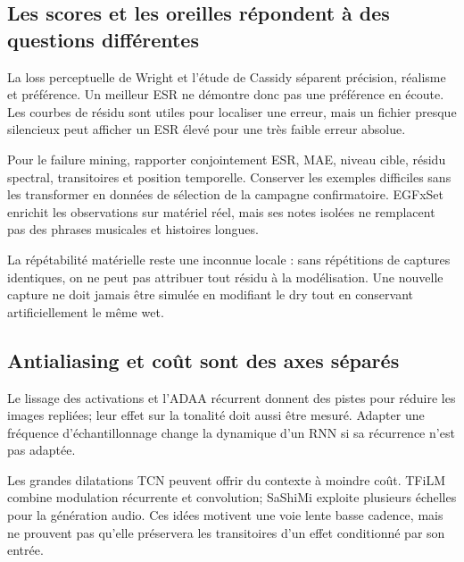 \documentclass[10pt,a4paper]{article}
\begin{document}
\subsection{Les scores et les oreilles r\'{e}pondent \`{a} des questions diff\'{e}rentes}

La loss perceptuelle de Wright et l'\'{e}tude de Cassidy s\'{e}parent pr\'{e}cision, r\'{e}alisme et pr\'{e}f\'{e}rence.
Un meilleur ESR ne d\'{e}montre donc pas une pr\'{e}f\'{e}rence en \'{e}coute. Les courbes de r\'{e}sidu sont
utiles pour localiser une erreur, mais un fichier presque silencieux peut afficher un ESR \'{e}lev\'{e}
pour une tr\`{e}s faible erreur absolue. \cite{wrightloss2020,cassidy2023}

Pour le failure mining, rapporter conjointement ESR, MAE, niveau cible, r\'{e}sidu spectral,
transitoires et position temporelle. Conserver les exemples difficiles sans les transformer
en donn\'{e}es de s\'{e}lection de la campagne confirmatoire. EGFxSet enrichit les observations sur
mat\'{e}riel r\'{e}el, mais ses notes isol\'{e}es ne remplacent pas des phrases musicales et histoires
longues. \cite{pedroza2022}

La r\'{e}p\'{e}tabilit\'{e} mat\'{e}rielle reste une inconnue locale : sans r\'{e}p\'{e}titions de captures identiques,
on ne peut pas attribuer tout r\'{e}sidu \`{a} la mod\'{e}lisation. Une nouvelle capture ne doit jamais
\^{e}tre simul\'{e}e en modifiant le dry tout en conservant artificiellement le m\^{e}me wet.

\subsection{Antialiasing et co\^{u}t sont des axes s\'{e}par\'{e}s}

Le lissage des activations et l'ADAA r\'{e}current donnent des pistes pour r\'{e}duire les images
repli\'{e}es; leur effet sur la tonalit\'{e} doit aussi \^{e}tre mesur\'{e}. Adapter une fr\'{e}quence d'\'{e}chantillonnage
change la dynamique d'un RNN si sa r\'{e}currence n'est pas adapt\'{e}e. \cite{sato2025,mikkonen2025,carson2024}

Les grandes dilatations TCN peuvent offrir du contexte \`{a} moindre co\^{u}t. TFiLM combine modulation
r\'{e}currente et convolution; SaShiMi exploite plusieurs \'{e}chelles pour la g\'{e}n\'{e}ration audio.
Ces id\'{e}es motivent une voie lente basse cadence, mais ne prouvent pas qu'elle pr\'{e}servera les
transitoires d'un effet conditionn\'{e} par son entr\'{e}e. \cite{steinmetz2021,birnbaum2019,goel2022}
\end{document}
